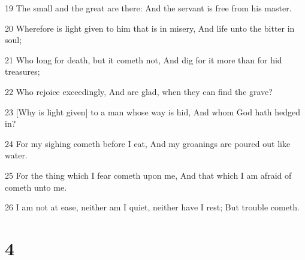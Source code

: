 \par 19 The small and the great are there: And the servant is free from his master.
\par 20 Wherefore is light given to him that is in misery, And life unto the bitter in soul;
\par 21 Who long for death, but it cometh not, And dig for it more than for hid treasures;
\par 22 Who rejoice exceedingly, And are glad, when they can find the grave?
\par 23 [Why is light given] to a man whose way is hid, And whom God hath hedged in?
\par 24 For my sighing cometh before I eat, And my groanings are poured out like water.
\par 25 For the thing which I fear cometh upon me, And that which I am afraid of cometh unto me.
\par 26 I am not at ease, neither am I quiet, neither have I rest; But trouble cometh.

\chapter{4}

